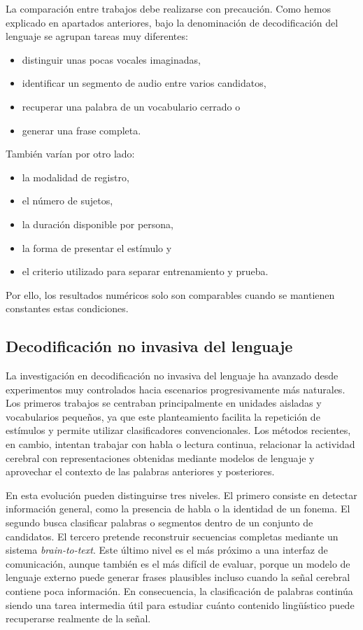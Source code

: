 La comparación entre trabajos debe realizarse con precaución. Como hemos explicado en apartados anteriores, bajo la denominación de decodificación del lenguaje se agrupan tareas muy diferentes:
\begin{itemize}
\setlength{\itemsep}{0pt}
\setlength{\parsep}{0pt}
\setlength{\topsep}{2pt}
\setlength{\partopsep}{0pt}
\item distinguir unas pocas vocales imaginadas, 
\item identificar un segmento de audio entre varios candidatos, 
\item recuperar una palabra de un vocabulario cerrado o 
\item generar una frase completa. 
\end{itemize} 
También varían por otro lado:
\begin{itemize}
\setlength{\itemsep}{0pt}
\setlength{\parsep}{0pt}
\setlength{\topsep}{2pt}
\setlength{\partopsep}{0pt}
\item la modalidad de registro, 
\item el número de sujetos, 
\item la duración disponible por persona, 
\item la forma de presentar el estímulo y 
\item el criterio utilizado para separar entrenamiento y prueba. 
\end{itemize} Por ello, los resultados numéricos solo son comparables cuando se mantienen constantes estas condiciones.

\subsection{Decodificación no invasiva del lenguaje}

La investigación en decodificación no invasiva del lenguaje ha avanzado desde experimentos muy controlados hacia escenarios progresivamente más naturales. Los primeros trabajos se centraban principalmente en unidades aisladas y vocabularios pequeños, ya que este planteamiento facilita la repetición de estímulos y permite utilizar clasificadores convencionales. Los métodos recientes, en cambio, intentan trabajar con habla o lectura continua, relacionar la actividad cerebral con representaciones obtenidas mediante modelos de lenguaje y aprovechar el contexto de las palabras anteriores y posteriores.

En esta evolución pueden distinguirse tres niveles. El primero consiste en detectar información general, como la presencia de habla o la identidad de un fonema. El segundo busca clasificar palabras o segmentos dentro de un conjunto de candidatos. El tercero pretende reconstruir secuencias completas mediante un sistema \textit{brain-to-text}. Este último nivel es el más próximo a una interfaz de comunicación, aunque también es el más difícil de evaluar, porque un modelo de lenguaje externo puede generar frases plausibles incluso cuando la señal cerebral contiene poca información. En consecuencia, la clasificación de palabras continúa siendo una tarea intermedia útil para estudiar cuánto contenido lingüístico puede recuperarse realmente de la señal.

